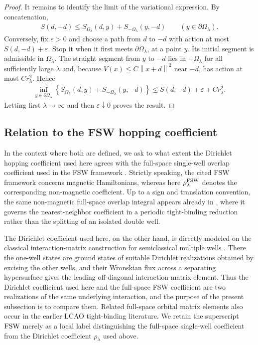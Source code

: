 \documentclass[a4paper,10pt]{article}
\numberwithin{equation}{section}
\theoremstyle{plain}
\theoremstyle{plain}
\theoremstyle{plain}
\theoremstyle{plain}
\theoremstyle{plain}
\theoremstyle{remark}
\theoremstyle{definition}
\newcommand\norm[1]{\left\lVert#1\right\rVert}
\newcommand{\eq}[1]{\begin{align*}#1\end{align*}}
\begin{document}
\begin{proof}
It remains to identify the limit of the variational expression. By
concatenation,
\eq{
S(d,-d)
\leq
S_{\Omega_\lambda}(d,y)
+S_{-\Omega_\lambda}(y,-d)
\qquad
(y\in\partial\Omega_\lambda).
}
Conversely, fix $\varepsilon>0$ and choose a path from $d$ to $-d$ with
action at most $S(d,-d)+\varepsilon$. Stop it when it first meets
$\partial\Omega_\lambda$, at a point $y$. Its initial segment is
admissible in $\Omega_\lambda$. The straight segment from $y$ to $-d$
lies in $-\Omega_\lambda$ for all sufficiently large $\lambda$ and,
because $V(x)\leq C\norm{x+d}^2$ near $-d$, has action at most
$Cr_\lambda^2$. Hence
\eq{
\inf_{y\in\partial\Omega_\lambda}
\left\{
S_{\Omega_\lambda}(d,y)
+S_{-\Omega_\lambda}(y,-d)
\right\}
\leq
S(d,-d)+\varepsilon+Cr_\lambda^2.
}
Letting first $\lambda\to\infty$ and then
$\varepsilon\downarrow0$ proves the result.
\end{proof}
\subsection{Relation to the FSW hopping coefficient}
In the context where both are defined, we ask to what extent the
Dirichlet hopping coefficient used here agrees with the full-space
single-well overlap coefficient used in the FSW framework
\cite{FeffermanShapiroWeinstein2022,Fefferman2025}. Strictly speaking,
the cited FSW framework concerns magnetic Hamiltonians, whereas here
$\rho_\lambda^{\rm FSW}$ denotes the corresponding non-magnetic
coefficient. Up to a sign and translation convention, the same
non-magnetic full-space overlap integral appears already in
\cite[Eq.~(4.7)]{FeffermanLeeThorpWeinstein2018}, where it governs the
nearest-neighbor coefficient in a periodic tight-binding reduction
rather than the splitting of an isolated double well.

The Dirichlet coefficient used here, on the other hand, is directly
modeled on the classical interaction-matrix construction for
semiclassical multiple wells
\cite{Helffer_Sjostrand_1984,DimassiSjostrand1999InteractionMatrix}.
There the one-well states are ground states of suitable Dirichlet
realizations obtained by excising the other wells, and their Wronskian
flux across a separating hypersurface gives the leading off-diagonal
interaction-matrix element. Thus the Dirichlet coefficient used here
and the full-space FSW coefficient are two realizations of the same
underlying interaction, and the purpose of the present subsection is
to compare them. Related full-space orbital matrix elements also occur
in the earlier LCAO tight-binding literature. We retain the superscript
${\rm FSW}$ merely as a local label distinguishing the full-space
single-well coefficient from the Dirichlet coefficient $\rho_\lambda$
used above.
\end{document}
